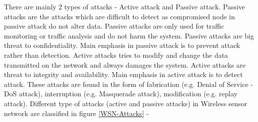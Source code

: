 There are mainly 2 types of attacks \cite{wahid2015survey}- Active attack and Passive attack. Passive attacks are the attacks which are difficult to detect as compromised node in passive attack do not alter data. Passive attacks are only used for traffic monitoring or traffic analysis and do not harm the system. Passive attacks are big threat to confidentiality. Main emphasis in passive attack is to prevent attack rather than detection. Active attacks tries to modify and change the data transmitted on the network and always damages the system. Active attacks are threat to integrity and availability. Main emphasis in active attack is to detect attack. These attacks are found in the form of fabrication (e.g. Denial of Service -DoS attack), interruption (e.g. Masquerade attack), modification (e.g. replay attack).  Different type of attacks (active and passive attacks) in Wireless sensor network are classified in figure \ref{WSN-Attacks} \cite{nayak2015impact, abirami2013sybil, singh2014survey} -
